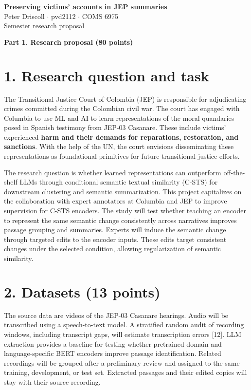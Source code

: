 \documentclass[11pt,letterpaper]{article}
\begin{document}
\begin{center}
{\large\bfseries Preserving victims' accounts in JEP summaries}\\[4pt]
Peter Driscoll \(\cdot\) pvd2112 \(\cdot\) COMS 6975\\
Semester research proposal
\end{center}

\textbf{Part 1. Research proposal (80 points)}

\section{1. Research question and task}
The Transitional Justice Court of Colombia (JEP) is responsible for adjudicating crimes committed during the Colombian civil war. The court has engaged with Columbia to use ML and AI to learn representations of the moral quandaries posed in Spanish testimony from JEP-03 Casanare. These include victims' experienced \textbf{harm and their demands for reparations, restoration, and sanctions}. With the help of the UN, the court envisions disseminating these representations as foundational primitives for future transitional justice efforts.

The research question is whether learned representations can outperform off-the-shelf LLMs through conditional semantic textual similarity (C-STS) for downstream clustering and semantic summarization. This project capitalizes on the collaboration with expert annotators at Columbia and JEP to improve supervision for C-STS encoders. The study will test whether teaching an encoder to represent the same semantic change consistently across narratives improves passage grouping and summaries. Experts will induce the semantic change through targeted edits to the encoder inputs. These edits target consistent changes under the selected condition, allowing regularization of semantic similarity.

\section{2. Datasets (13 points)}
The source data are videos of the JEP-03 Casanare hearings. Audio will be transcribed using a speech-to-text model. A stratified random audit of recording windows, including transcript gaps, will estimate transcription errors [12]. LLM extraction provides a baseline for testing whether pretrained domain and language-specific BERT encoders improve passage identification. Related recordings will be grouped after a preliminary review and assigned to the same training, development, or test set. Extracted passages and their edited copies will stay with their source recording.
\end{document}
